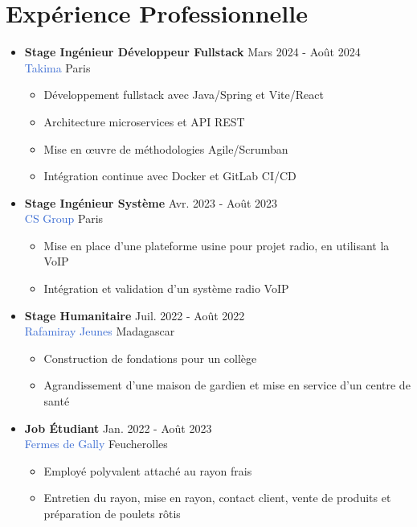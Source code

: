 \documentclass[11pt, a4paper]{article}
\begin{document}
\section*{Expérience Professionnelle}
\begin{itemize}
    \item \textbf{Stage Ingénieur Développeur Fullstack} \hfill Mars 2024 - Août 2024\\
          \textcolor{highlight}{Takima} \hfill Paris
          \begin{itemize}
              \item Développement fullstack avec Java/Spring et Vite/React
              \item Architecture microservices et API REST
              \item Mise en œuvre de méthodologies Agile/Scrumban
              \item Intégration continue avec Docker et GitLab CI/CD
          \end{itemize}

    \item \textbf{Stage Ingénieur Système} \hfill Avr. 2023 - Août 2023\\
          \textcolor{highlight}{CS Group} \hfill Paris
          \begin{itemize}
              \item Mise en place d'une plateforme usine pour projet radio, en utilisant la VoIP
              \item Intégration et validation d'un système radio VoIP
          \end{itemize}

    \item \textbf{Stage Humanitaire} \hfill Juil. 2022 - Août 2022\\
          \textcolor{highlight}{Rafamiray Jeunes} \hfill Madagascar
          \begin{itemize}
              \item Construction de fondations pour un collège
              \item Agrandissement d'une maison de gardien et mise en service d'un centre de santé
          \end{itemize}

    \item \textbf{Job Étudiant} \hfill Jan. 2022 - Août 2023\\
          \textcolor{highlight}{Fermes de Gally} \hfill Feucherolles
          \begin{itemize}
              \item Employé polyvalent attaché au rayon frais
              \item Entretien du rayon, mise en rayon, contact client, vente de produits et préparation de poulets rôtis
          \end{itemize}
\end{itemize}
\end{document}
